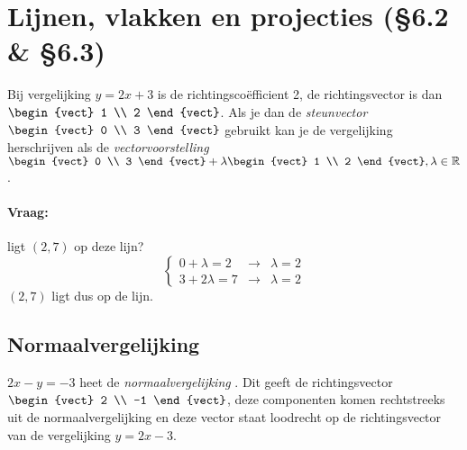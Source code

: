 \section{Lijnen, vlakken en projecties (\S6.2 \& \S6.3)}
Bij vergelijking $y = 2x + 3$ is de richtingsco\"efficient 2, de richtingsvector is dan $\begin{vect} 1 \\ 2 \end{vect}$. Als je dan de \emph{steunvector}  $\begin{vect} 0 \\ 3 \end{vect}$ gebruikt kan je de vergelijking herschrijven als de \emph{vectorvoorstelling} $\begin{vect} 0 \\ 3 \end{vect} + \lambda \begin{vect} 1 \\ 2 \end{vect}, \lambda \in \mathbb{R}$.
\paragraph{Vraag:} ligt $(2, 7)$ op deze lijn?
\[ \left\{ \begin{array}{lcl}
	0 + \lambda = 2 &\to& \lambda = 2 \\
	3 + 2\lambda=7 &\to& \lambda = 2
\end{array}\right. \]
$(2, 7)$ ligt dus op de lijn.

\subsection{Normaalvergelijking}
$2x-y=-3$ heet de \emph{normaalvergelijking} . Dit geeft de richtingsvector $\begin{vect} 2 \\ -1 \end{vect}$, deze componenten komen rechtstreeks uit de normaalvergelijking en deze vector staat loodrecht op de richtingsvector van de vergelijking $y = 2x-3$.

